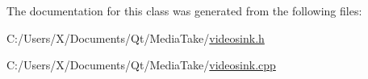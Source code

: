 The documentation for this class was generated from the following files\-:\begin{DoxyCompactItemize}
\item 
C\-:/\-Users/\-X/\-Documents/\-Qt/\-Media\-Take/\hyperlink{videosink_8h}{videosink.\-h}\item 
C\-:/\-Users/\-X/\-Documents/\-Qt/\-Media\-Take/\hyperlink{videosink_8cpp}{videosink.\-cpp}\end{DoxyCompactItemize}
